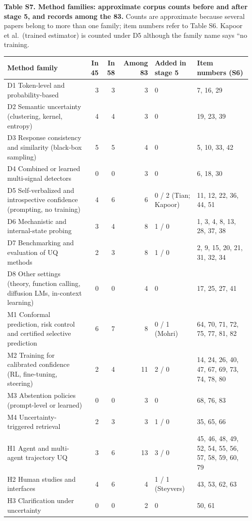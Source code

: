 \documentclass[acmsmall]{acmart}
\begin{document}
\noindent\textbf{Table S7. Method families: approximate corpus counts before and after stage 5, and records among the 83.} Counts are approximate because several papers belong to more than one family; item numbers refer to Table S6. Kapoor et al.\ (trained estimator) is counted under D5 although the family name says ``no training.
\begin{center}
\tiny
\begin{longtable}{@{}p{3.6cm} r r r p{2.0cm} p{1.9cm}@{}}
\toprule
Method family & In 45 & In 58 & Among 83 & Added in stage 5 & Item numbers (S6) \\
\midrule
\endhead
\bottomrule
\endfoot
D1 Token-level and probability-based & 3 & 3 & 3 & 0 & 7, 16, 29 \\
D2 Semantic uncertainty (clustering, kernel, entropy) & 4 & 4 & 3 & 0 & 19, 23, 39 \\
D3 Response consistency and similarity (black-box sampling) & 5 & 5 & 4 & 0 & 5, 10, 33, 42 \\
D4 Combined or learned multi-signal detectors & 0 & 0 & 3 & 0 & 6, 18, 30 \\
D5 Self-verbalized and introspective confidence (prompting, no training) & 4 & 6 & 6 & 0 / 2 (Tian; Kapoor) & 11, 12, 22, 36, 44, 51 \\
D6 Mechanistic and internal-state probing & 3 & 4 & 8 & 1 / 0 & 1, 3, 4, 8, 13, 28, 37, 38 \\
D7 Benchmarking and evaluation of UQ methods & 2 & 3 & 8 & 1 / 0 & 2, 9, 15, 20, 21, 31, 32, 34 \\
D8 Other settings (theory, function calling, diffusion LMs, in-context learning) & 0 & 0 & 4 & 0 & 17, 25, 27, 41 \\
M1 Conformal prediction, risk control and certified selective prediction & 6 & 7 & 8 & 0 / 1 (Mohri) & 64, 70, 71, 72, 75, 77, 81, 82 \\
M2 Training for calibrated confidence (RL, fine-tuning, steering) & 2 & 4 & 11 & 2 / 0 & 14, 24, 26, 40, 47, 67, 69, 73, 74, 78, 80 \\
M3 Abstention policies (prompt-level or learned) & 0 & 0 & 3 & 0 & 68, 76, 83 \\
M4 Uncertainty-triggered retrieval & 2 & 3 & 3 & 1 / 0 & 35, 65, 66 \\
H1 Agent and multi-agent trajectory UQ & 3 & 6 & 13 & 3 / 0 & 45, 46, 48, 49, 52, 54, 55, 56, 57, 58, 59, 60, 79 \\
H2 Human studies and interfaces & 4 & 6 & 4 & 1 / 1 (Steyvers) & 43, 53, 62, 63 \\
H3 Clarification under uncertainty & 0 & 0 & 2 & 0 & 50, 61 \\
\end{longtable}
\end{center}
\end{document}
